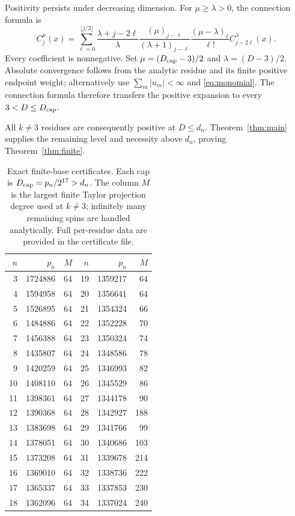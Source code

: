 \documentclass[11pt,a4paper]{article}
\theoremstyle{remark}\newtheorem{remark}[theorem]{Remark}
\begin{document}
Positivity persists under decreasing dimension. For $\mu\geq\lambda>0$, the connection formula \cite[Eq.~18.18.16]{DLMF} is
\begin{equation}\label{eq:connection}
 C_j^\mu(x)=\sum_{\ell=0}^{\lfloor j/2\rfloor}
 \frac{\lambda+j-2\ell}{\lambda}
 \frac{(\mu)_{j-\ell}}{(\lambda+1)_{j-\ell}}
 \frac{(\mu-\lambda)_\ell}{\ell!}
 C_{j-2\ell}^{\lambda}(x).
\end{equation}
Every coefficient is nonnegative. Set $\mu=(D_{\rm cap}-3)/2$ and $\lambda=(D-3)/2$. Absolute convergence follows from the analytic residue and its finite positive endpoint weight; alternatively use $\sum_m|u_m|<\infty$ and \eqref{eq:monomial}. The connection formula therefore transfers the positive expansion to every $3<D\leq D_{\rm cap}$.

All $k\neq3$ residues are consequently positive at $D\leq d_n$. Theorem~\ref{thm:main} supplies the remaining level and necessity above $d_n$, proving Theorem~\ref{thm:finite}.

\begin{table}[t]
\centering
\caption{Exact finite-base certificates. Each cap is $D_{\rm cap}=p_n/2^{17}>d_n$. The column $M$ is the largest finite Taylor projection degree used at $k\neq3$; infinitely many remaining spins are handled analytically. Full per-residue data are provided in the certificate file.}\label{tab:caps}
\begin{tabular}{r r r @{\qquad} r r r}\toprule
$n$&$p_n$&$M$&$n$&$p_n$&$M$\\\midrule
3 & 1724886 & 64 & 19 & 1359217 & 64 \\
4 & 1594958 & 64 & 20 & 1356641 & 64 \\
5 & 1526895 & 64 & 21 & 1354324 & 66 \\
6 & 1484886 & 64 & 22 & 1352228 & 70 \\
7 & 1456388 & 64 & 23 & 1350324 & 74 \\
8 & 1435807 & 64 & 24 & 1348586 & 78 \\
9 & 1420259 & 64 & 25 & 1346993 & 82 \\
10 & 1408110 & 64 & 26 & 1345529 & 86 \\
11 & 1398361 & 64 & 27 & 1344178 & 90 \\
12 & 1390368 & 64 & 28 & 1342927 & 188 \\
13 & 1383698 & 64 & 29 & 1341766 & 99 \\
14 & 1378051 & 64 & 30 & 1340686 & 103 \\
15 & 1373208 & 64 & 31 & 1339678 & 214 \\
16 & 1369010 & 64 & 32 & 1338736 & 222 \\
17 & 1365337 & 64 & 33 & 1337853 & 230 \\
18 & 1362096 & 64 & 34 & 1337024 & 240 \\
\bottomrule\end{tabular}
\end{table}
\end{document}
